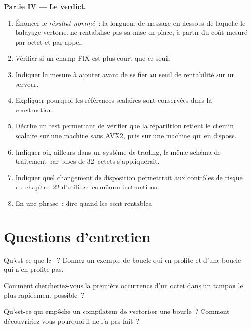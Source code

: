 \begin{problem}
\medskip\noindent\textbf{Partie IV --- Le verdict.}
\begin{enumerate}[resume]
\item Énoncer le \emph{résultat nommé}~: la longueur de message en dessous de laquelle le balayage vectoriel ne rentabilise pas sa mise en place, à partir du
coût mesuré par octet et par appel.
\item Vérifier si un champ FIX est plus court que ce seuil.
\item Indiquer la mesure à ajouter avant de se fier au seuil de rentabilité sur un serveur.
\item Expliquer pourquoi les références scalaires sont conservées dans la construction.
\item Décrire un test permettant de vérifier que la répartition retient le chemin scalaire sur une machine sans AVX2, puis sur une machine qui en dispose.
\item Indiquer où, ailleurs dans un système de trading, le même schéma de traitement par blocs de 32~octets s'appliquerait.
\item Indiquer quel changement de disposition permettrait aux contrôles de risque du chapitre~22 d'utiliser les mêmes instructions.
\item En une phrase~: dire quand les  sont rentables.
\end{enumerate}
\end{problem}

\section{Questions d'entretien}

\begin{interviewq}\label{iq:ll:vector-instructions-and-data-parallel-code:1}
Qu'est-ce que le ~? Donnez un exemple de boucle qui en profite et d'une boucle qui n'en profite pas.
\end{interviewq}

\begin{interviewq}\label{iq:ll:vector-instructions-and-data-parallel-code:2}
Comment chercheriez-vous la première occurrence d'un octet dans un tampon le plus rapidement possible~?
\end{interviewq}

\begin{interviewq}\label{iq:ll:vector-instructions-and-data-parallel-code:3}
Qu'est-ce qui empêche un compilateur de vectoriser une boucle~? Comment découvririez-vous pourquoi il ne l'a pas fait~?
\end{interviewq}

